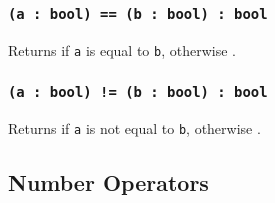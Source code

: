 \subsubsection{\texttt{(a : bool) == (b : bool) : bool}}

Returns \true{} if \texttt{a} is equal to \texttt{b}, otherwise \false{}.

\subsubsection{\texttt{(a : bool) != (b : bool) : bool}}

Returns \true{} if \texttt{a} is not equal to \texttt{b}, otherwise \false{}.

\subsection{Number Operators}

